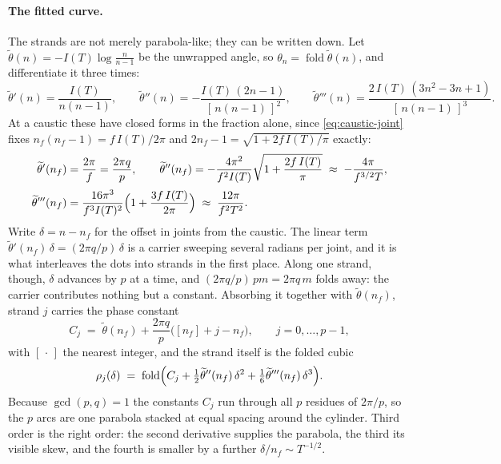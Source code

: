 \documentclass[11pt]{article}
\theoremstyle{definition}
\begin{document}
\paragraph{The fitted curve.} The strands are not merely parabola-like; they can
be written down. Let $\widetilde\theta(n)=-I(T)\log\frac{n}{n-1}$ be the
unwrapped angle, so $\theta_n=\operatorname{fold}\widetilde\theta(n)$, and
differentiate it three times:
\begin{equation}\label{eq:jangle-derivs}
\widetilde\theta'(n)=\frac{I(T)}{n(n-1)},\qquad
\widetilde\theta''(n)=-\frac{I(T)\,(2n-1)}{[\,n(n-1)\,]^{2}},\qquad
\widetilde\theta'''(n)=\frac{2\,I(T)\,(3n^{2}-3n+1)}{[\,n(n-1)\,]^{3}}.
\end{equation}
At a caustic these have closed forms in the fraction alone, since
\eqref{eq:caustic-joint} fixes $n_f(n_f-1)=f\,I(T)/2\pi$ and
$2n_f-1=\sqrt{1+2f\,I(T)/\pi}$ exactly:
\begin{equation}\label{eq:caustic-derivs}
\begin{aligned}
\widetilde\theta'(n_f)&=\frac{2\pi}{f}=\frac{2\pi q}{p},
\qquad
\widetilde\theta''(n_f)=-\frac{4\pi^{2}}{f^{2}I(T)}
\sqrt{1+\frac{2f\,I(T)}{\pi}}\;\approx\;-\frac{4\pi}{f^{3/2}T},\\[2pt]
\widetilde\theta'''(n_f)&=\frac{16\pi^{3}}{f^{3}I(T)^{2}}
\Bigl(1+\frac{3f\,I(T)}{2\pi}\Bigr)\;\approx\;\frac{12\pi}{f^{2}T^{2}}.
\end{aligned}
\end{equation}
Write $\delta=n-n_f$ for the offset in joints from the caustic. The linear term
$\widetilde\theta'(n_f)\,\delta=(2\pi q/p)\,\delta$ is a carrier sweeping several
radians per joint, and it is what interleaves the dots into strands in the first
place. Along one strand, though, $\delta$ advances by $p$ at a time, and
$(2\pi q/p)\,pm=2\pi q\,m$ folds away: the carrier contributes nothing but a
constant. Absorbing it together with $\widetilde\theta(n_f)$, strand $j$ carries
the phase constant
\begin{equation}\label{eq:caustic-Cj}
C_j\;=\;\widetilde\theta(n_f)+\frac{2\pi q}{p}\bigl([n_f]+j-n_f\bigr),
\qquad j=0,\dots,p-1,
\end{equation}
with $[\,\cdot\,]$ the nearest integer, and the strand itself is the folded cubic
\begin{equation}\label{eq:fitted-arc}
\rho_j(\delta)\;=\;\operatorname{fold}\Bigl(C_j
+\tfrac12\widetilde\theta''(n_f)\,\delta^{2}
+\tfrac16\widetilde\theta'''(n_f)\,\delta^{3}\Bigr).
\end{equation}
Because $\gcd(p,q)=1$ the constants $C_j$ run through all $p$ residues of
$2\pi/p$, so the $p$ arcs are one parabola stacked at equal spacing around the
cylinder. Third order is the right order: the second derivative supplies the
parabola, the third its visible skew, and the fourth is smaller by a further
$\delta/n_f\sim T^{-1/2}$.
\end{document}
